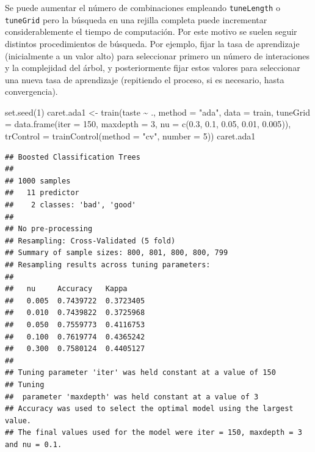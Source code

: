 \documentclass[
]{book}
\newenvironment{Shaded}{\begin{snugshade}}{\end{snugshade}}
\newcommand{\AttributeTok}[1]{\textcolor[rgb]{0.77,0.63,0.00}{#1}}
\newcommand{\DecValTok}[1]{\textcolor[rgb]{0.00,0.00,0.81}{#1}}
\newcommand{\FloatTok}[1]{\textcolor[rgb]{0.00,0.00,0.81}{#1}}
\newcommand{\FunctionTok}[1]{\textcolor[rgb]{0.00,0.00,0.00}{#1}}
\newcommand{\NormalTok}[1]{#1}
\newcommand{\OtherTok}[1]{\textcolor[rgb]{0.56,0.35,0.01}{#1}}
\newcommand{\SpecialCharTok}[1]{\textcolor[rgb]{0.00,0.00,0.00}{#1}}
\newcommand{\StringTok}[1]{\textcolor[rgb]{0.31,0.60,0.02}{#1}}
\theoremstyle{break}
\theoremstyle{definition}
\theoremstyle{definition}
\theoremstyle{definition}
\theoremstyle{definition}
\theoremstyle{remark}
\begin{document}
Se puede aumentar el número de combinaciones empleando \texttt{tuneLength} o \texttt{tuneGrid} pero la búsqueda en una rejilla completa puede incrementar considerablemente el tiempo de computación.
Por este motivo se suelen seguir distintos procedimientos de búsqueda. Por ejemplo, fijar la tasa de aprendizaje (inicialmente a un valor alto) para seleccionar primero un número de interaciones y la complejidad del árbol, y posteriormente fijar estos valores para seleccionar una nueva tasa de aprendizaje (repitiendo el proceso, si es necesario, hasta convergencia).

\begin{Shaded}
\begin{Highlighting}[]
\FunctionTok{set.seed}\NormalTok{(}\DecValTok{1}\NormalTok{)}
\NormalTok{caret.ada1 }\OtherTok{\textless{}{-}} \FunctionTok{train}\NormalTok{(taste }\SpecialCharTok{\textasciitilde{}}\NormalTok{ ., }\AttributeTok{method =} \StringTok{"ada"}\NormalTok{, }\AttributeTok{data =}\NormalTok{ train,}
                    \AttributeTok{tuneGrid =} \FunctionTok{data.frame}\NormalTok{(}\AttributeTok{iter =}  \DecValTok{150}\NormalTok{, }\AttributeTok{maxdepth =} \DecValTok{3}\NormalTok{,}
                                 \AttributeTok{nu =} \FunctionTok{c}\NormalTok{(}\FloatTok{0.3}\NormalTok{, }\FloatTok{0.1}\NormalTok{, }\FloatTok{0.05}\NormalTok{, }\FloatTok{0.01}\NormalTok{, }\FloatTok{0.005}\NormalTok{)),}
                   \AttributeTok{trControl =} \FunctionTok{trainControl}\NormalTok{(}\AttributeTok{method =} \StringTok{"cv"}\NormalTok{, }\AttributeTok{number =} \DecValTok{5}\NormalTok{))}
\NormalTok{caret.ada1}
\end{Highlighting}
\end{Shaded}

\begin{verbatim}
## Boosted Classification Trees 
## 
## 1000 samples
##   11 predictor
##    2 classes: 'bad', 'good' 
## 
## No pre-processing
## Resampling: Cross-Validated (5 fold) 
## Summary of sample sizes: 800, 801, 800, 800, 799 
## Resampling results across tuning parameters:
## 
##   nu     Accuracy   Kappa    
##   0.005  0.7439722  0.3723405
##   0.010  0.7439822  0.3725968
##   0.050  0.7559773  0.4116753
##   0.100  0.7619774  0.4365242
##   0.300  0.7580124  0.4405127
## 
## Tuning parameter 'iter' was held constant at a value of 150
## Tuning
##  parameter 'maxdepth' was held constant at a value of 3
## Accuracy was used to select the optimal model using the largest value.
## The final values used for the model were iter = 150, maxdepth = 3 and nu = 0.1.
\end{verbatim}
\end{document}
